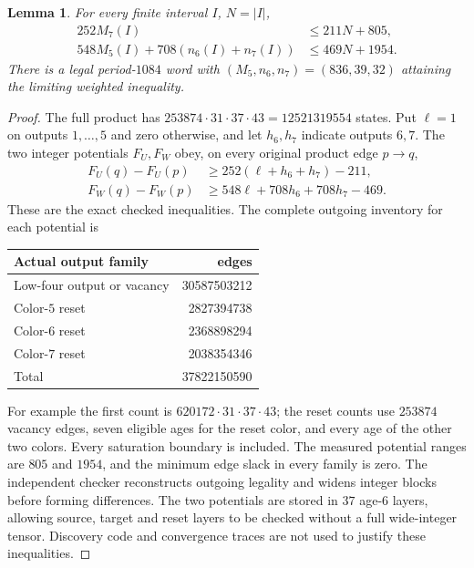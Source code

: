 \documentclass[11pt,reqno]{amsart}
\theoremstyle{plain}
\theoremstyle{plain}
\theoremstyle{plain}
\newtheorem{Slemma}[Stheorem]{Lemma}
\begin{document}
\begin{Slemma}\label{S-lem:cr-seven-cert}
For every finite interval $I$, $N=|I|$,
\begin{align}
 252M_7(I)&\le211N+805,\label{S-eq:cr-seven-finite}\\
 548M_5(I)+708(n_6(I)+n_7(I))&\le469N+1954.
       \label{S-eq:cr-seven-weighted-finite}
\end{align}
There is a legal period-$1084$ word with $(M_5,n_6,n_7)=(836,39,32)$
attaining the limiting weighted inequality.
\end{Slemma}
\begin{proof}
The full product has $253874\cdot31\cdot37\cdot43=12521319554$
states. Put $\ell=1$ on outputs $1,\ldots,5$ and zero otherwise,
and let $h_6,h_7$ indicate outputs $6,7$. The two integer potentials
$F_U,F_W$ obey, on every original product edge $p\to q$,
\begin{align*}
 F_U(q)-F_U(p)&\ge252(\ell+h_6+h_7)-211,\\
 F_W(q)-F_W(p)&\ge548\ell+708h_6+708h_7-469.
\end{align*}
These are the exact checked inequalities. The complete outgoing
inventory for each potential is
\begin{center}\small
\begin{tabular}{@{}lr@{}}\toprule
Actual output family&edges\\\midrule
Low-four output or vacancy&30587503212\\
Color-$5$ reset&2827394738\\
Color-$6$ reset&2368898294\\
Color-$7$ reset&2038354346\\\midrule
Total&37822150590\\\bottomrule
\end{tabular}
\end{center}
For example the first count is $620172\cdot31\cdot37\cdot43$;
the reset counts use $253874$ vacancy edges, seven eligible ages
for the reset color, and every age of the other two colors. Every
saturation boundary is included. The measured potential ranges are
$805$ and $1954$, and the minimum edge slack in every family is zero.
The independent checker reconstructs outgoing legality and widens
integer blocks before forming differences. The two potentials are
stored in $37$ age-$6$ layers, allowing source, target and reset
layers to be checked without a full wide-integer tensor. Discovery
code and convergence traces are not used to justify these inequalities.


\end{proof}
\end{document}
